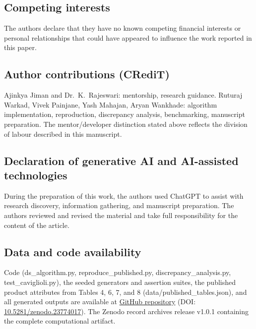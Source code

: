 \documentclass[a4paper]{elsarticle}
\begin{document}
\subsection{Competing interests}
The authors declare that they have no known competing financial interests or personal relationships that could have appeared to influence the work reported in this paper.

\subsection{Author contributions (CRediT)}
Ajinkya Jiman and Dr.~K.~Rajeswari: mentorship, research guidance.
Ruturaj Warkad, Vivek Painjane, Yash Mahajan, Aryan Wankhade: algorithm implementation, reproduction, discrepancy analysis, benchmarking, manuscript preparation.
The mentor/developer distinction stated above reflects the division of labour described in this manuscript.

\subsection{Declaration of generative AI and AI-assisted technologies}
During the preparation of this work, the authors used ChatGPT to assist with research discovery, information gathering, and manuscript preparation. The authors reviewed and revised the material and take full responsibility for the content of the article.

\subsection{Data and code availability}
Code (ds\_algorithm.py, reproduce\_published.py, discrepancy\_analysis.py, test\_caviglioli.py), the seeded generators and assertion suites, the published product attributes from Tables 4, 6, 7, and 8 (data/published\_tables.json), and all generated outputs are available at \href{https://github.com/yashmahajan11234567/cmpb-medicine-substitution-scoring}{GitHub repository} (DOI: \href{https://doi.org/10.5281/zenodo.23774017}{10.5281/zenodo.23774017}). The Zenodo record archives release v1.0.1 containing the complete computational artifact.



\end{document}
